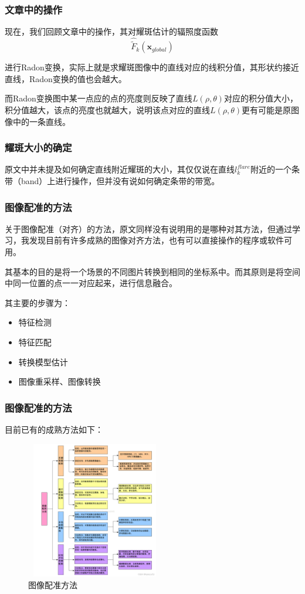 \documentclass{beamer}
\begin{document}
\begin{frame}
\frametitle{文章中的操作}
现在，我们回顾文章中的操作，其对耀斑估计的辐照度函数
\begin{equation}
\hat{\widetilde{F}}_k(\textbf{x}_{global})
\end{equation}\pause

进行Radon变换，实际上就是求耀斑图像中的直线对应的线积分值，其形状约接近直线，Radon变换的值也会越大。

而Radon变换图中某一点应的点的亮度则反映了直线$L(\rho,\theta)$对应的积分值大小，积分值越大，该点的亮度也就越大，说明该点对应的直线$L(\rho,\theta)$更有可能是原图像中的一条直线。
\end{frame}
\begin{frame}
\frametitle{耀斑大小的确定}
原文中并未提及如何确定直线附近耀斑的大小，其仅仅说在直线$l_k^{flare}$附近的一个条带（band）上进行操作，但并没有说如何确定条带的带宽。
\end{frame}
\begin{frame}
\frametitle{图像配准的方法}
关于图像配准（对齐）的方法，原文同样没有说明用的是哪种对其方法，但通过学习，我发现目前有许多成熟的图像对齐方法，也有可以直接操作的程序或软件可用。\pause

其基本的目的是将一个场景的不同图片转换到相同的坐标系中。而其原则是将空间中同一位置的点一一对应起来，进行信息融合。\pause

其主要的步骤为：
\begin{itemize}
\item 特征检测
\item 特征匹配
\item 转换模型估计
\item 图像重采样、图像转换
\end{itemize}
\end{frame}
\begin{frame}
\frametitle{图像配准的方法}
目前已有的成熟方法如下：
\begin{figure}[!h]
\centering
\includegraphics[height=6cm,width=6cm]{2022120902.png}
\caption{图像配准方法}
\end{figure}
\end{frame}
\end{document}
